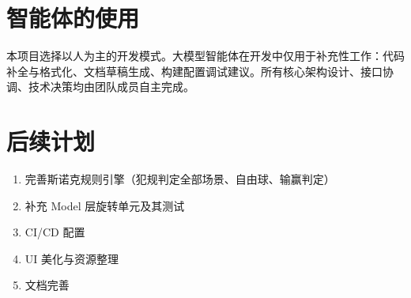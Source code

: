 \documentclass[11pt]{ctexart}
\begin{document}
\section{智能体的使用}

本项目选择以人为主的开发模式。大模型智能体在开发中仅用于补充性工作：代码补全与格式化、文档草稿生成、构建配置调试建议。所有核心架构设计、接口协调、技术决策均由团队成员自主完成。

\section{后续计划}

\begin{enumerate}[leftmargin=*]
\item 完善斯诺克规则引擎（犯规判定全部场景、自由球、输赢判定）
\item 补充 Model 层旋转单元及其测试
\item CI/CD 配置
\item UI 美化与资源整理
\item 文档完善
\end{enumerate}
\end{document}
